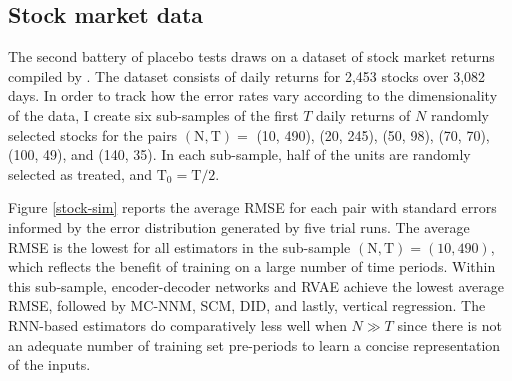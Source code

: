 \subsection{Stock market data}

The second battery of placebo tests draws on a dataset of stock market returns compiled by \citet{athey2017matrix}. The dataset consists of daily returns for 2,453 stocks over 3,082 days. In order to track how the error rates vary according to the dimensionality of the data, I create six sub-samples of the first $T$ daily returns of $N$ randomly selected stocks for the pairs $(\text{N}, \text{T}) = $ (10, 490), (20, 245), (50, 98), (70, 70), (100, 49), and (140, 35). In each sub-sample, half of the units are randomly selected as treated, and $\text{T}_0 = \text{T}/2$.

Figure \ref{stock-sim} reports the average RMSE for each pair with standard errors informed by the error distribution generated by five trial runs. The average RMSE is the lowest for all estimators in the sub-sample $(\text{N}, \text{T}) = (10, 490)$, which reflects the benefit of training on a large number of time periods. Within this sub-sample, encoder-decoder networks and RVAE achieve the lowest average RMSE, followed by MC-NNM, SCM, DID, and lastly, vertical regression. The RNN-based estimators do comparatively less well when $N \gg T$ since there is not an adequate number of training set pre-periods to learn a concise representation of the inputs. 

